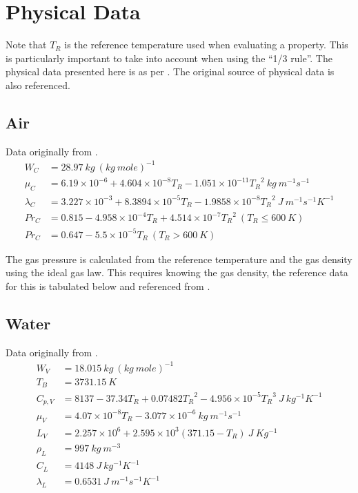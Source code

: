 \documentclass[../Interim_Report_Master]{subfiles}
\begin{document}
\section{Physical Data}
Note that $T_R$ is the reference temperature used when evaluating a property. This is particularly important to take into account when using the ``1/3 rule''. The physical data presented here is as per \cite{Miller1998}. The original source of physical data is also referenced.

\subsection{Air}
Data originally from \cite{harpole1981}.
\begin{subequations}
\begin{align}
W_C &= 28.97~kg~(kg~mole)^{-1} \\
\mu_C &= 6.19\times 10^{-6} + 4.604\times 10^{-8}T_R - 1.051\times 10^{-11}{T_R}^2~kg~m^{-1}s^{-1} \\
\lambda_C &= 3.227\times 10^{-3} + 8.3894\times 10^{-5}T_R - 1.9858\times 10^{-8}{T_R}^2~J~m^{-1}s^{-1}K^{-1} \\
Pr_C &= 0.815 - 4.958\times 10^{-4}T_R + 4.514\times 10^{-7}{T_R}^2~(T_R\leq 600~K) \\
Pr_C &= 0.647 - 5.5\times 10^{-5}T_R~(T_R>600~K) 
\end{align}
\end{subequations}

The gas pressure is calculated from the reference temperature and the gas density using the ideal gas law. This requires knowing the gas density, the reference data for this is tabulated below and referenced from \cite{cengel2008}.

\subsection{Water}
Data originally from \cite{harpole1981}.
\begin{subequations}
\begin{align}
W_V &= 18.015~kg~(kg~mole)^{-1} \\
T_B &= 3731.15~K \\
C_{p,V} &= 8137 - 37.34T_R + 0.07482{T_R}^2 - 4.956\times 10^{-5}{T_R}^3~J~kg^{-1}K^{-1} \\
\mu_V &= 4.07\times 10^{-8}T_R - 3.077\times 10^{-6}~kg~m^{-1}s^{-1} \\
L_V &= 2.257\times 10^{6} + 2.595\times 10^{3}(371.15-T_R)~J~Kg^{-1} \\
\rho_L &= 997~kg~m^{-3} \\
C_L &= 4148~J~kg^{-1}K^{-1} \\
\lambda_L &= 0.6531~J~m^{-1}s^{-1}K^{-1}
\end{align}
\end{subequations}
\end{document}
